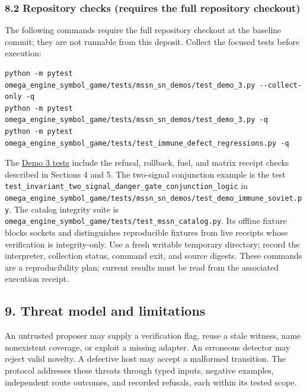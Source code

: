 \documentclass[
  11pt,
]{article}
\begin{document}
\hypertarget{repository-checks-requires-the-full-repository-checkout}{%
\subsubsection{8.2 Repository checks (requires the full repository
checkout)}\label{repository-checks-requires-the-full-repository-checkout}}

The following commands require the full repository checkout at the
baseline commit; they are not runnable from this deposit. Collect the
focused tests before execution:

\begin{lstlisting}
python -m pytest omega_engine_symbol_game/tests/mssn_sn_demos/test_demo_3.py --collect-only -q
python -m pytest omega_engine_symbol_game/tests/mssn_sn_demos/test_demo_3.py -q
python -m pytest omega_engine_symbol_game/tests/test_immune_defect_regressions.py -q
\end{lstlisting}

The
\href{https://github.com/dbccpage/the_symbol_game/blob/52cb5457f6c485ba548cfd292f6012a941ed22cf/omega_engine_symbol_game/tests/mssn_sn_demos/test_demo_3.py}{Demo
3 tests} include the refusal, rollback, fuel, and matrix receipt checks
described in Sections 4 and 5. The two-signal conjunction example is the
test
\texttt{\nolinkurl{test_invariant_two_signal_danger_gate_conjunction_logic}}
in
\texttt{\nolinkurl{omega_engine_symbol_game/tests/mssn_sn_demos/test_demo_immune_soviet.py}}.
The catalog integrity suite is
\texttt{\nolinkurl{omega_engine_symbol_game/tests/test_mssn_catalog.py}}.
Its offline fixture blocks sockets and distinguishes reproducible
fixtures from live receipts whose verification is integrity-only. Use a
fresh writable temporary directory; record the interpreter, collection
status, command exit, and source digests. These commands are a
reproducibility plan; current results must be read from the associated
execution receipt.

\hypertarget{threat-model-and-limitations}{%
\subsection{9. Threat model and
limitations}\label{threat-model-and-limitations}}

An untrusted proposer may supply a verification flag, reuse a stale
witness, name nonexistent coverage, or exploit a missing adapter. An
erroneous detector may reject valid novelty. A defective host may accept
a malformed transition. The protocol addresses these threats through
typed inputs, negative examples, independent route outcomes, and
recorded refusals, each within its tested scope.
\end{document}
